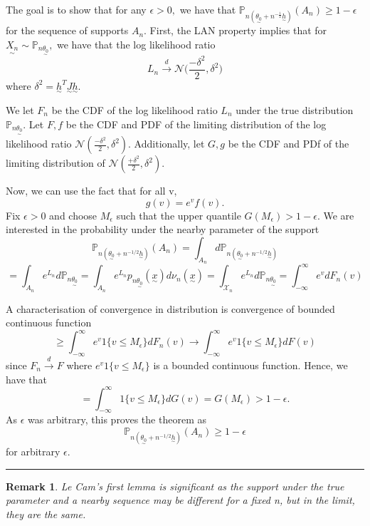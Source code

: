\documentclass[twoside]{article}
\newtheorem{remark}[theorem]{Remark}
\newenvironment{proof}{{\bf Proof:}}{\hfill\rule{2mm}{2mm}}
\newcommand{\prob}{\mathbb{P}}
\newcommand{\utilde}{\underset{\sim}}
\begin{document}
\begin{proof} The goal is to show that for any $\epsilon > 0,$ we have that $\prob_{n(\utilde{\theta_0} + n^{-\frac{1}{2}}\utilde{h})}(A_n) \geq 1 - \epsilon$ for the sequence of supports $A_n.$ First, the LAN property implies that for $\utilde{X_n} \sim \prob_{n \utilde{\theta_0}},$ we have that the log likelihood ratio
$$
L_n \xrightarrow{d} \mathcal{N}\bigg(\frac{-\delta^2}{2}, \delta^2\bigg)
$$
where $\delta^2 = \utilde{h}^T\utilde{J}\utilde{h}.$

We let $F_n$ be the CDF of the log likelihood ratio $L_n$ under the true distribution $\prob_{n \utilde{\theta_0}}.$ Let $F, f$ be the CDF and PDF of the limiting distribution of the log likelihood ratio $\mathcal{N}(\frac{-\delta^2}{2}, \delta^2).$ Additionally, let $G, g$ be the CDF and PDf of the limiting distribution of $\mathcal{N}(\frac{+\delta^2}{2}, \delta^2)$. 

Now, we can use the fact that for all v,
$$
g(v) = e^vf(v).
$$
Fix $\epsilon > 0$ and choose $M_{\epsilon}$ such that the upper quantile $G(M_{\epsilon}) > 1 - \epsilon.$ We are interested in the probability under the nearby parameter of the support 
$$
\prob_{n(\utilde{\theta_0} + n^{-1/2}\utilde{h})} (A_n) = \int_{A_n}d\prob_{n(\utilde{\theta_0} + n^{-1/2}\utilde{h})}
$$
$$
= \int_{A_{n}}e^{L_n}d\prob_{n \utilde{\theta_0}} = \int_{A_{n}}e^{L_n}p_{n \utilde{\theta_0}}(\utilde{x})d\nu_n(\utilde{x}) = \int_{\mathcal{X}_n}e^{L_n}d\prob_{n \utilde{\theta_0}} = \int_{-\infty}^{\infty}e^vdF_n(v)
$$

A characterisation of convergence in distribution is convergence of bounded continuous function 
$$
\geq \int_{-\infty}^{\infty}e^v 1\{v \leq M_{\epsilon}\} dF_n(v) \rightarrow \int_{-\infty}^{\infty}e^v 1\{v \leq M_{\epsilon}\} dF(v)
$$
since $F_n \xrightarrow{d} F$ where $e^v 1\{v \leq M_{\epsilon}\}$ is a bounded continuous function. Hence, we have that 
$$
= \int_{-\infty}^{\infty} 1\{v \leq M_{\epsilon}\} dG(v) = G(M_{\epsilon}) > 1 - \epsilon.
$$
As $\epsilon$ was arbitrary, this proves the theorem as 
$$
\prob_{n(\utilde{\theta_0} + n^{-1/2}\utilde{h})} (A_n) \geq 1 - \epsilon
$$
for arbitrary $\epsilon.$
\end{proof}


\begin{remark}Le Cam's first lemma is significant as the support under the true parameter and a nearby sequence may be different for a fixed n, but in the limit, they are the same.
\end{remark}
\end{document}
